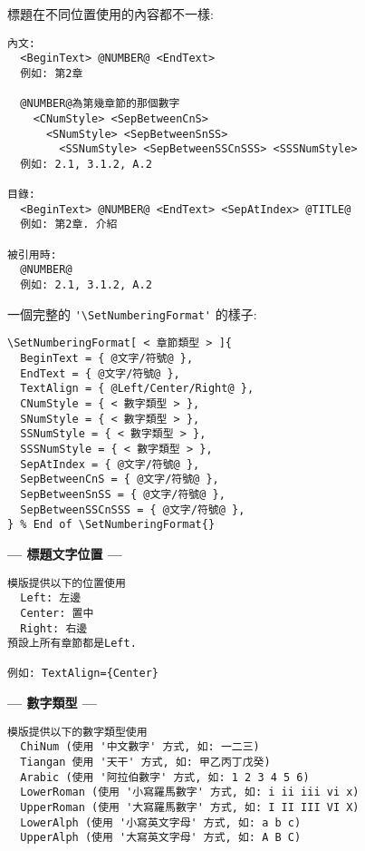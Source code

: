 \begin{enumerate}
{    標題在不同位置使用的內容都不一樣:
    \begin{DescriptionFrame}
    \begin{verbatim}
內文:
  <BeginText> @NUMBER@ <EndText>
  例如: 第2章

  @NUMBER@為第幾章節的那個數字
    <CNumStyle> <SepBetweenCnS>
      <SNumStyle> <SepBetweenSnSS>
        <SSNumStyle> <SepBetweenSSCnSSS> <SSSNumStyle>
  例如: 2.1, 3.1.2, A.2

目錄:
  <BeginText> @NUMBER@ <EndText> <SepAtIndex> @TITLE@
  例如: 第2章. 介紹

被引用時:
  @NUMBER@
  例如: 2.1, 3.1.2, A.2
    \end{verbatim}
    \end{DescriptionFrame}

  \newpage
    一個完整的 \verb|'\SetNumberingFormat'| 的樣子:
    \begin{DescriptionFrame}
    \begin{verbatim}
\SetNumberingFormat[ < 章節類型 > ]{
  BeginText = { @文字/符號@ },
  EndText = { @文字/符號@ },
  TextAlign = { @Left/Center/Right@ },
  CNumStyle = { < 數字類型 > },
  SNumStyle = { < 數字類型 > },
  SSNumStyle = { < 數字類型 > },
  SSSNumStyle = { < 數字類型 > },
  SepAtIndex = { @文字/符號@ },
  SepBetweenCnS = { @文字/符號@ },
  SepBetweenSnSS = { @文字/符號@ },
  SepBetweenSSCnSSS = { @文字/符號@ },
} % End of \SetNumberingFormat{}
    \end{verbatim}
    \end{DescriptionFrame}

    \textbf{--- 標題文字位置 ---}
    \begin{DescriptionFrame}
    \begin{verbatim}
模版提供以下的位置使用
  Left: 左邊
  Center: 置中
  Right: 右邊
預設上所有章節都是Left.

例如: TextAlign={Center}
    \end{verbatim}
    \end{DescriptionFrame}

  \newpage
    \textbf{--- 數字類型 ---}
    \begin{DescriptionFrame}
    \begin{verbatim}
模版提供以下的數字類型使用
  ChiNum (使用 '中文數字' 方式, 如: 一二三)
  Tiangan 使用 '天干' 方式, 如: 甲乙丙丁戊癸)
  Arabic (使用 '阿拉伯數字' 方式, 如: 1 2 3 4 5 6)
  LowerRoman (使用 '小寫羅馬數字' 方式, 如: i ii iii vi x)
  UpperRoman (使用 '大寫羅馬數字' 方式, 如: I II III VI X)
  LowerAlph (使用 '小寫英文字母' 方式, 如: a b c)
  UpperAlph (使用 '大寫英文字母' 方式, 如: A B C)


\end{verbatim}
\end{DescriptionFrame}}
\end{enumerate}
